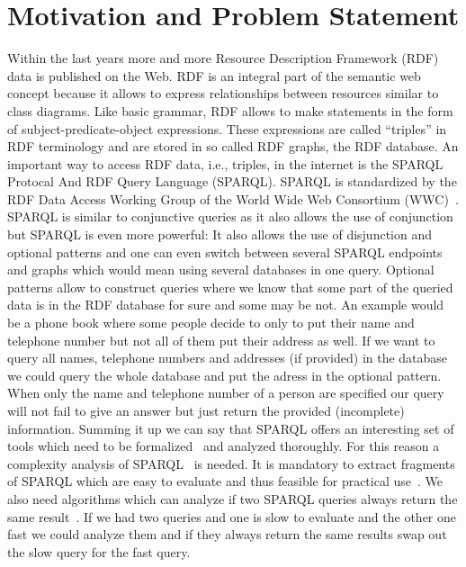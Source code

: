 \section{Motivation and Problem Statement}
Within the last years more and more Resource Description Framework
(RDF)~\cite{rdf} data is
published on the Web. RDF is an integral part of the semantic web concept
because it allows to express relationships between resources similar to class
diagrams. Like basic grammar, RDF allows to make statements in the form of subject-predicate-object
expressions. These expressions are called ``triples'' in RDF terminology and are
stored in so called RDF graphs, the RDF database.
An important way to access RDF data, i.e., triples, in the internet is the SPARQL Protocal And
RDF Query Language (SPARQL). SPARQL is standardized by the RDF Data Access
Working Group of the World Wide Web Consortium (WWC)~\cite{w3standard}.
SPARQL is similar to conjunctive queries as it also allows the use of conjunction but SPARQL is even
more powerful: It also allows the use of disjunction and optional patterns and one
can even switch between several SPARQL endpoints and graphs which would mean using several
databases in one query. %
Optional patterns allow to construct queries where we know that some part of the
queried data is in the RDF database for sure and some may be not. 
An example would be a phone book where some people decide to
only to put their name and telephone number but not all of them put their
address as well. If we want to query all names, telephone numbers and
addresses (if provided) in the database we could query the whole database and put the adress in the
optional pattern. When only the name and telephone number of a person are
specified our query will not fail to give an answer but just return the provided (incomplete)
information. Summing it up we can say that SPARQL offers an interesting set of tools which need to be
formalized~\cite{perez2006semantics} and analyzed thoroughly. For this reason a complexity analysis of
SPARQL~\cite{perez2009semantics} is needed. It is mandatory to extract fragments of SPARQL which are easy to evaluate and thus feasible for practical use~\cite{perez2009semantics}. We also need algorithms which can
analyze if two SPARQL queries always return the same
result~\cite{pichler2014containment}.
If we had two queries and one is slow to evaluate and the other one fast we could
analyze them and if they always return the same results swap out the slow query
for the fast query.

